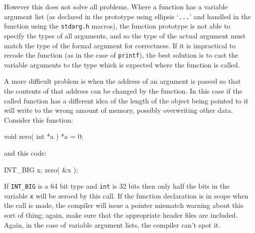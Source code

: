 \documentclass[twoside,11pt,nolof]{starlink}
\providecommand{\file}[1]{\texttt{#1}}
\providecommand{\cc}[1]{\texttt{#1}}
\newenvironment{squote}{\begin{small}}{\end{small}}
\begin{document}
However this does not solve all problems.
Where a function has a variable argument list
(as declared in the prototype using ellipsis `\cc{...}'
and handled in the function using the \file{stdarg.h} macros),
the function prototype
is not able to specify the types of all arguments,
and so the type of the actual argument must match the type of
the formal argument for correctness.  If it is impractical
to recode the function (as in the case of \cc{printf}),
the best solution is to cast the variable arguments to the type
which is expected where the function is called.

A more difficult problem is when the address of an argument is
passed so that the contents of that address can be changed by
the function.  In this case if the called function has a
different idea of the length of the object being pointed to
it will write to the wrong amount of memory, possibly overwriting
other data.  Consider this function:
\begin{squote}
\begin{terminalv}
   void zero( int *a ) {
      *a = 0;
   }
\end{terminalv}
\end{squote}
and this code:
\begin{squote}
\begin{terminalv}
   INT_BIG x;
   zero( &x );
\end{terminalv}
\end{squote}
If \cc{INT\_BIG} is a 64 bit type and \cc{int} is 32 bits
then only half the bits in the variable \cc{x} will be zeroed by this call.
If the function declaration is in scope when the call is made,
the compiler will issue a pointer mismatch warning about this sort of thing;
again, make sure that the appropriate header files are included.
Again, in the case of variable argument lists, the compiler can't spot it.
\end{document}
